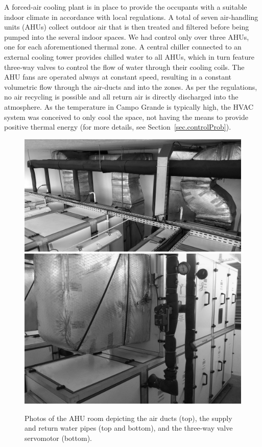 A forced-air cooling plant is in place to provide the occupants with a suitable indoor climate in accordance with local regulations. A total of seven air-handling units (AHUs) collect outdoor air that is then treated and filtered before being pumped into the several indoor spaces. We had control only over three AHUs, one for each aforementioned thermal zone. A central chiller connected to an external cooling tower provides chilled water to all AHUs, which in turn feature three-way valves to control the flow of water through their cooling coils. The AHU fans are operated always at constant speed, resulting in a constant volumetric flow through the air-ducts and into the zones. As per the regulations, no air recycling is possible and all return air is directly discharged into the atmosphere. As the temperature in Campo Grande is typically high, the HVAC system was conceived to only cool the space, not having the means to provide positive thermal energy (for more details, see Section~\ref{sec.controlProb}).

\begin{figure}[!t]
	\centering
	\includegraphics[width=0.75\linewidth]{../images/chap3_ahus_b.jpg} \\[8pt]
	\includegraphics[width=0.75\linewidth]{../images/chap3_ahus_a.jpg} 
	\caption{Photos of the AHU room depicting the air ducts (top), the supply and return water pipes (top and bottom), and the three-way valve servomotor (bottom).}
	\label{fig.ahuRoom}
\end{figure}

